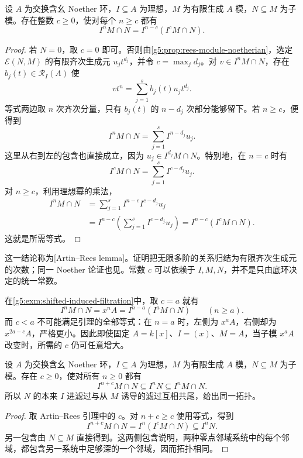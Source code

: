 \begin{theorem}\label{g5:thm:artin-rees}
	设 \(A\) 为交换含幺 Noether 环，\(I\subseteq A\) 为理想，\(M\) 为有限生成 \(A\) 模，\(N\subseteq M\) 为子模。存在整数 \(c\geq0\)，使对每个 \(n\geq c\) 都有
	\begin{equation}\label{g5:eq:artin-rees}
		I^nM\cap N=I^{n-c}(I^cM\cap N).
	\end{equation}
\end{theorem}
\begin{proof}
	若 \(N=0\)，取 \(c=0\) 即可。否则由\cref{g5:prop:rees-module-noetherian}，选定 \(\mathcal E(N,M)\) 的有限齐次生成元 \(u_jt^{d_j}\)，并令 \(c=\max_jd_j\)。对 \(v\in I^nM\cap N\)，存在 \(b_j(t)\in\mathcal R_I(A)\) 使
	\[
		vt^n=\sum_{j=1}^s b_j(t)u_jt^{d_j}.
	\]
	等式两边取 \(n\) 次齐次分量，只有 \(b_j(t)\) 的 \(n-d_j\) 次部分能够留下。若 \(n\geq c\)，便得到
	\[
		I^nM\cap N=\sum_{j=1}^s I^{n-d_j}u_j.
	\]
	这里从右到左的包含也直接成立，因为 \(u_j\in I^{d_j}M\cap N\)。特别地，在 \(n=c\) 时有
	\[
		I^cM\cap N=\sum_{j=1}^s I^{c-d_j}u_j.
	\]
	对 \(n\geq c\)，利用理想幂的乘法，
	\[
		\begin{aligned}
			I^nM\cap N
			&=\sum_{j=1}^s I^{n-c}I^{c-d_j}u_j\\
			&=I^{n-c}\left(\sum_{j=1}^s I^{c-d_j}u_j\right)
			=I^{n-c}(I^cM\cap N).
		\end{aligned}
	\]
	这就是所需等式。
\end{proof}

这一结论称为[Artin–Rees lemma]。证明把无限多阶的关系归结为有限齐次生成元的次数；同一 Noether 论证也见\cite[第8节，定理8.5，第59页]{Matsumura1989}。常数 \(c\) 可以依赖于 \(I,M,N\)，并不是只由底环决定的统一常数。

\begin{example}\label{g5:exm:artin-rees-shift}
	在\cref{g5:exm:shifted-induced-filtration}中，取 \(c=a\) 就有
	\[
		I^nM\cap N=x^nA
		=I^{n-a}(I^aM\cap N)\qquad(n\geq a).
	\]
	而 \(c<a\) 不可能满足引理的全部等式：在 \(n=a\) 时，左侧为 \(x^aA\)，右侧却为 \(x^{2a-c}A\)，严格更小。因此即使固定 \(A=k[x]\)、\(I=(x)\)、\(M=A\)，当子模 \(x^aA\) 改变时，所需的 \(c\) 仍可任意增大。
\end{example}

\begin{corollary}\label{g5:cor:induced-adic-topology}
	设 \(A\) 为交换含幺 Noether 环，\(I\subseteq A\) 为理想，\(M\) 为有限生成 \(A\) 模，\(N\subseteq M\) 为子模。存在 \(c\geq0\)，使对所有 \(n\geq0\) 都有
	\[
		I^{n+c}M\cap N\subseteq I^nN\subseteq I^nM\cap N.
	\]
	所以 \(N\) 的本来 \(I\) 进滤过与从 \(M\) 诱导的滤过互相共尾，给出同一拓扑。
\end{corollary}
\begin{proof}
	取 Artin–Rees 引理中的 \(c\)。对 \(n+c\geq c\) 使用等式，得到
	\[
		I^{n+c}M\cap N
		=I^n(I^cM\cap N)\subseteq I^nN.
	\]
	另一包含由 \(N\subseteq M\) 直接得到。这两侧包含说明，两种零点邻域系统中的每个邻域，都包含另一系统中足够深的一个邻域，因而拓扑相同。
\end{proof}

